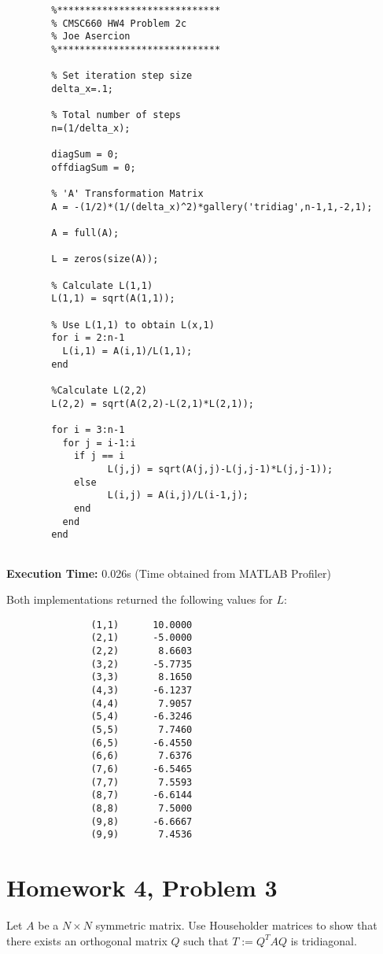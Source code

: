 \documentclass{article}
\newcommand{\n}{\newline}
\begin{document}
		\begin{lstlisting}
		%*****************************
		% CMSC660 HW4 Problem 2c
		% Joe Asercion
		%***************************** 
		
		% Set iteration step size
		delta_x=.1;
		
		% Total number of steps
		n=(1/delta_x);
		
		diagSum = 0;
		offdiagSum = 0;
		
		% 'A' Transformation Matrix
		A = -(1/2)*(1/(delta_x)^2)*gallery('tridiag',n-1,1,-2,1);
		
		A = full(A);
		
		L = zeros(size(A));
		
		% Calculate L(1,1)
		L(1,1) = sqrt(A(1,1));
		
		% Use L(1,1) to obtain L(x,1)
		for i = 2:n-1
		  L(i,1) = A(i,1)/L(1,1);
		end
		
		%Calculate L(2,2)
		L(2,2) = sqrt(A(2,2)-L(2,1)*L(2,1));
		
		for i = 3:n-1
		  for j = i-1:i
			if j == i
		          L(j,j) = sqrt(A(j,j)-L(j,j-1)*L(j,j-1));
			else
		          L(i,j) = A(i,j)/L(i-1,j);
		    end
		  end
	    end
		
		\end{lstlisting}
		
		\begin{flushleft}
			\textbf{Execution Time: } 0.026s
			(Time obtained from MATLAB Profiler)\n
			
		Both implementations returned the following values for $L$:
		
		\begin{lstlisting}
			   (1,1)      10.0000
			   (2,1)      -5.0000
			   (2,2)       8.6603
			   (3,2)      -5.7735
			   (3,3)       8.1650
			   (4,3)      -6.1237
			   (4,4)       7.9057
			   (5,4)      -6.3246
			   (5,5)       7.7460
			   (6,5)      -6.4550
			   (6,6)       7.6376
			   (7,6)      -6.5465
			   (7,7)       7.5593
			   (8,7)      -6.6144
			   (8,8)       7.5000
			   (9,8)      -6.6667
			   (9,9)       7.4536
		\end{lstlisting}
		
	\end{flushleft}
	\section{Homework 4, Problem 3}
	Let $A$ be a $N\times N$ symmetric matrix.  Use Householder matrices to show that there exists an orthogonal matrix $Q$ such that $T:=Q^{T}AQ$ is tridiagonal.
	
\end{document}
